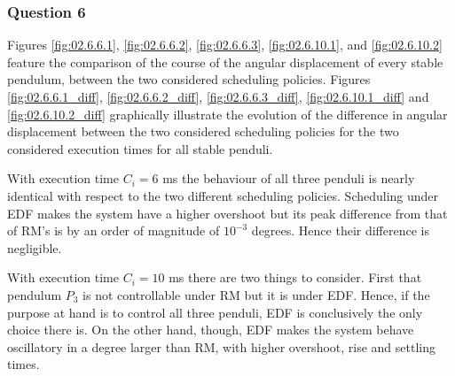 \subsubsection{Question 6}

Figures \ref{fig:02.6.6.1}, \ref{fig:02.6.6.2}, \ref{fig:02.6.6.3},
\ref{fig:02.6.10.1}, and \ref{fig:02.6.10.2} feature the comparison of the
course of the angular displacement of every stable pendulum, between the two
considered scheduling policies. Figures \ref{fig:02.6.6.1_diff},
\ref{fig:02.6.6.2_diff}, \ref{fig:02.6.6.3_diff}, \ref{fig:02.6.10.1_diff} and
\ref{fig:02.6.10.2_diff} graphically illustrate the evolution of the difference
in angular displacement between the two considered scheduling policies for the
two considered execution times for all stable penduli.

With execution time $C_i = 6$ ms the behaviour of all three penduli is nearly
identical with respect to the two different scheduling policies. Scheduling
under EDF makes the system have a higher overshoot but its peak difference from
that of RM's is by an order of magnitude of $10^{-3}$ degrees. Hence their
difference is negligible.

With execution time $C_i = 10$ ms there are two things to consider. First that
pendulum $P_3$ is not controllable under RM but it is under EDF. Hence, if the
purpose at hand is to control all three penduli, EDF is conclusively the only
choice there is. On the other hand, though, EDF makes the system behave
oscillatory in a degree larger than RM, with higher overshoot, rise and settling
times.

\noindent{}

